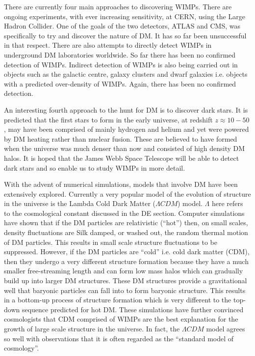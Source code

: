 \documentclass[a4paper,12pt]{article}
\begin{document}
There are currently four main approaches to discovering WIMPs. There are ongoing experiments, with ever increasing sensitivity, at CERN, using
the Large Hadron Collider. One of the goals of the two detectors, ATLAS and CMS, was specifically to try and discover the nature of DM. It has so far been unsuccessful in that respect.
There are also attempts to directly detect WIMPs in underground DM laboratories worldwide. So far there has been no confirmed detection of WIMPs. Indirect detection of WIMPs is also being
carried out in objects such as the galactic centre, galaxy clusters and dwarf galaxies i.e. objects with a predicted over-density of WIMPs. Again, there has been no confirmed detection.

An interesting fourth approach to the hunt for DM is to discover dark stars. It is predicted that the first stars to form in the early universe, at redshift $z\approx 10-50$, may have been 
comprised of mainly hydrogen and helium and yet were powered by DM heating rather than nuclear fusion. These are believed to have formed when the universe was much denser than now and 
consisted of high density DM halos. It is hoped that the James Webb Space Telescope will be able to detect dark stars and so enable us to study WIMPs in more detail.

With the advent of numerical simulations, models that involve DM have been extensively explored. Currently a very popular model of the evolution of structure in the universe is
the Lambda Cold Dark Matter ($\Lambda CDM$) model. $\Lambda$ here refers to the cosmological constant discussed in the DE section. 
Computer simulations have shown that if the DM particles are relativistic (``hot'') then, on small scales, density fluctuations are Silk damped, or
washed out, the random thermal motion of DM particles. This results in small scale structure fluctuations to be suppressed. However, if the DM particles are ``cold'' i.e. cold dark matter (CDM), then
they undergo a very different structure formation because they have a much smaller free-streaming length and can form low mass halos which can gradually build up into larger DM
structures. These DM structures provide a gravitational well that baryonic particles can fall into to form baryonic structure. This results in a bottom-up process of structure 
formation which is very different to the top-down sequence predicted for hot DM. These simulations have further convinced cosmologists that CDM comprised of WIMPs are the best
explanation for the growth of large scale structure in the universe. In fact, the $\Lambda CDM$ model agrees so well with observations that it is often regarded as the ``standard model
of cosmology''.
\end{document}
